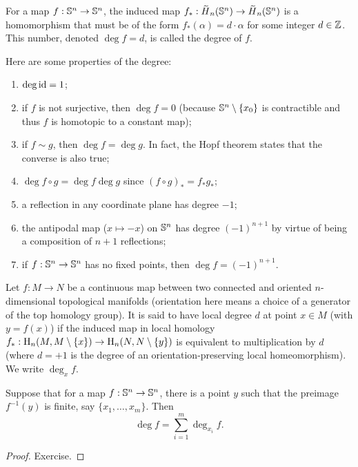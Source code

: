 \begin{defn}\label{Degree}
    For a map $f:\mathbb{S}^n\to \mathbb{S}^n$, the induced map $f_\ast:\wt{H}_n(\bbS^n)\to \wt{H}_n(\bbS^n)$ is a homomorphism that must be of the form $f_\ast(\alpha)=d\cdot \alpha$ for some integer $d\in\mathbb{Z}$. This number, denoted $\deg f=d$, is called the degree of $f$.
\end{defn}
Here are some properties of the degree:
\begin{enumerate}
    \item $\deg\operatorname{id}=1$;
    \item if $f$ is not surjective, then $\deg f=0$ (because $\mathbb{S}^n\setminus\{x_0\}$ is contractible and thus $f$ is homotopic to a constant map);
    \item if $f\sim g$, then $\deg f=\deg g$. In fact, the Hopf theorem states that the converse is also true;
    \item $\deg f\circ g=\deg f\deg g$ since $(f\circ g)_\ast=f_\ast g_\ast $;
    \item a reflection in any coordinate plane has degree $-1$;
    \item the antipodal map ($x\mapsto -x$) on $\mathbb{S}^n$ has degree $(-1)^{n+1}$ by virtue of being a composition of $n+1$ reflections;
    \item if $f:\mathbb{S}^n\to \mathbb{S}^n$ has no fixed points, then $\deg f=(-1)^{n+1}$.
\end{enumerate}


\begin{defn}
    Let $f:M\to N$ be a continuous map between two connected and oriented $n$-dimensional topological manifolds (orientation here means a choice of a generator of the top homology group). It is said to have local degree $d$ at point $x\in M$ (with $y=f(x)$) if the induced map in local homology $f_\ast:\mathrm{H}_n(M,M\setminus\{x\})\to \mathrm{H}_n(N,N\setminus\{y\})$ is equivalent to multiplication by $d$ (where $d=+1$ is the degree of an orientation-preserving local homeomorphism). We write $\deg_x f$.
\end{defn}

\begin{prop}\label{prop local degree formula}
    Suppose that for a map $f:\mathbb{S}^n\to \mathbb{S}^n$, there is a point $y$ such that the preimage $f^{-1}(y)$ is finite, say $\{x_1,\ldots,x_m\}$. Then \[\deg f=\sum_{i=1}^m \deg_{x_i} f.\]
\end{prop}
\begin{proof}
     Exercise.
\end{proof}

